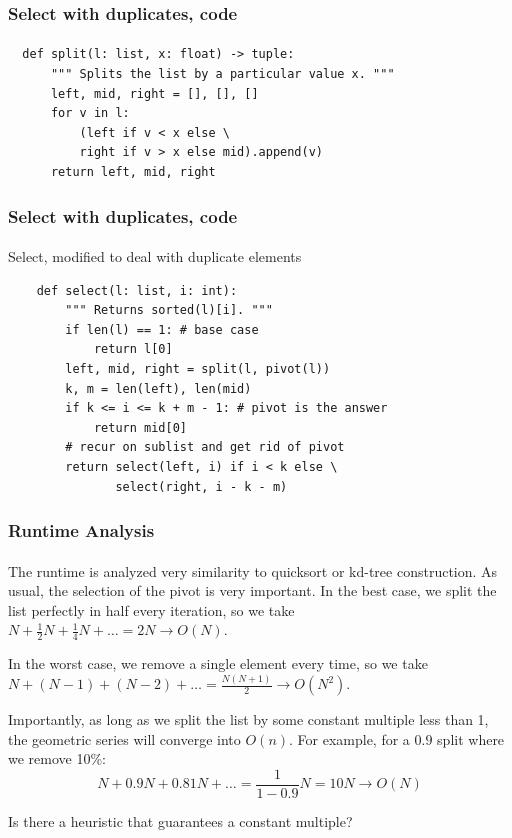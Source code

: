 \documentclass{beamer}                             %
\begin{document}
\begin{frame}[fragile]
\frametitle{Select with duplicates, code}
\framesubtitle{}
\begin{verbatim}
  def split(l: list, x: float) -> tuple:
      """ Splits the list by a particular value x. """
      left, mid, right = [], [], []
      for v in l:
          (left if v < x else \
          right if v > x else mid).append(v)
      return left, mid, right
\end{verbatim} 
\end{frame}

\begin{frame}[fragile]
\frametitle{Select with duplicates, code}
\framesubtitle{}
\begin{algorithm}[H]
  \caption{Select, modified to deal with duplicate elements}
  \begin{verbatim}
    def select(l: list, i: int):
        """ Returns sorted(l)[i]. """
        if len(l) == 1: # base case
            return l[0]
        left, mid, right = split(l, pivot(l))
        k, m = len(left), len(mid)
        if k <= i <= k + m - 1: # pivot is the answer
            return mid[0]
        # recur on sublist and get rid of pivot
        return select(left, i) if i < k else \
               select(right, i - k - m)
  \end{verbatim}
\end{algorithm}
\end{frame}

\begin{frame}
\frametitle{Runtime Analysis}
\framesubtitle{}
The runtime is analyzed very similarity to quicksort or kd-tree construction.
As usual, the selection of the pivot is very important. In the best case,
we split the list perfectly in half every iteration, so we take
\( N + \frac{1}{2}N + \frac{1}{4}N + \ldots = 2N \rightarrow O(N) \). \pause

In the worst case, we remove a single element every time, so we take
\( N + (N - 1) + (N - 2) + \ldots = \frac{N(N + 1)}{2} \rightarrow O(N^2) \).
\pause

Importantly, as long as we split the list by some constant multiple less than
1, the geometric series will converge into \( O(n) \).
For example, for a \( 0.9 \) split where we remove 10\%: 
\[ N + 0.9N + 0.81N + \ldots = \frac{1}{1 - 0.9} N = 10N \rightarrow O(N) \]
\pause

Is there a heuristic that guarantees a constant multiple?
\end{frame}
\end{document}
